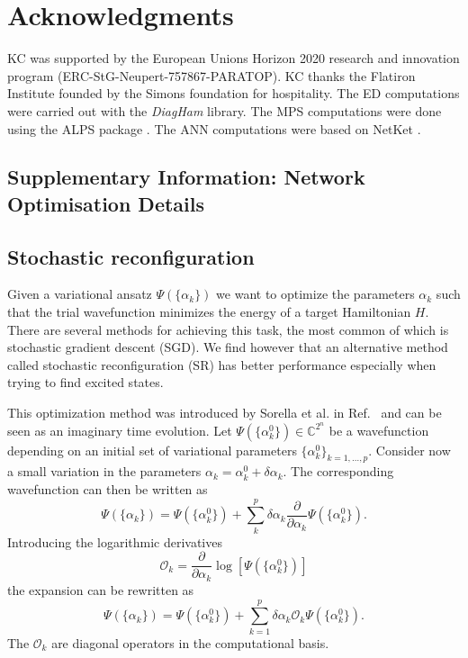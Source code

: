 \documentclass[aps,prl,twocolumn,amsmath,amssymb,superscriptaddress,floatfix]{revtex4-1}
\begin{document}
 

\section*{Acknowledgments}
KC was supported by the European Unions Horizon 2020 research and innovation program (ERC-StG-Neupert-757867-PARATOP). KC thanks the Flatiron Institute founded by the Simons foundation for hospitality.
The ED computations were carried out with the \textit{DiagHam} library.
The MPS computations were done using the ALPS package \cite{Dolfi2014}.
The ANN computations were based on NetKet \cite{NetKet}.



\clearpage
\begin{widetext}
\section*{Supplementary Information: Network Optimisation Details}


\subsection{Stochastic reconfiguration}
Given a variational ansatz $\Psi(\lbrace \alpha_{k} \rbrace)$ we want to optimize the parameters $\alpha_{k}$ such that the trial wavefunction minimizes the energy of a target Hamiltonian $H$. There are several methods for achieving this task, the most common of which is stochastic gradient descent (SGD). We find however that an alternative method called stochastic reconfiguration (SR) has better performance especially when trying to find excited states. 

This optimization method was introduced by Sorella et al. in Ref.~\cite{Sorella2007SR} and can be seen as an imaginary time evolution. Let $\Psi(\lbrace \alpha^{0}_{k} \rbrace) \in \mathbb{C}^{2^n}$ be a wavefunction depending on an initial set of variational parameters $\lbrace \alpha^{0}_{k} \rbrace_{k=1, \dots, p}$. Consider now a small variation in the parameters $\alpha_{k} = \alpha^{0}_{k} + \delta \alpha_{k}$. The corresponding wavefunction can then be written as
\begin{equation}
\Psi(\lbrace \alpha_{k} \rbrace) = \Psi(\lbrace \alpha^{0}_{k} \rbrace) + \sum^{p}_{k} \delta \alpha_{k} \frac{\partial}{\partial \alpha_{k}} \Psi(\lbrace \alpha^{0}_{k} \rbrace).
\end{equation}
Introducing the logarithmic derivatives
\begin{equation}
\mathcal{O}_{k} = \frac{\partial}{\partial \alpha_{k}} \log\left[\Psi(\lbrace \alpha^{0}_{k} \rbrace)\right]
\end{equation}
the expansion can be rewritten as 
\begin{equation}
\Psi(\lbrace \alpha_{k} \rbrace) = \Psi(\lbrace \alpha_{k}^{0} \rbrace) + \sum^{p}_{k=1} \delta \alpha_{k} \mathcal{O}_{k} \Psi(\lbrace \alpha^{0}_{k} \rbrace).
\end{equation}
The  $\mathcal{O}_{k}$ are diagonal operators in the computational basis.


\end{widetext}
\end{document}
